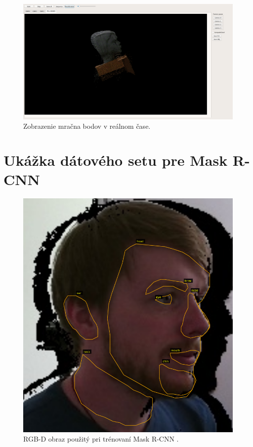 \begin{figure}[H]
	\centering
	\includegraphics[width=\textwidth]{figures/hmi2.png}
	\caption{Zobrazenie mračna bodov v reálnom čase.}
	\label{fig:hmi:b}
\end{figure}

\newpage
\section{Ukážka dátového setu pre Mask R-CNN } \label{sec:Priloha:Label}

\begin{figure}[H]
	\centering
	\includegraphics[width=\textwidth]{figures/rcnn_label3.png}
	\caption{RGB-D obraz použitý pri trénovaní Mask R-CNN .}
	\label{fig:mask_label}
\end{figure}

